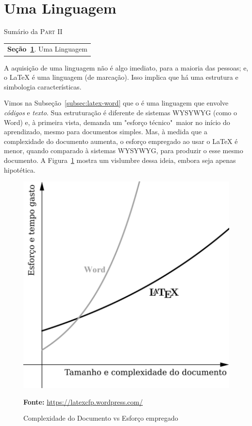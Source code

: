 \section{Uma Linguagem} %
\label{sec:aprendendo}

\begin{margintable}\vspace{.8in}\footnotesize
  \caption{Sumário da \textsc{Part II}}
  \medskip
  \begin{tabularx}{\marginparwidth}{|X}
    \textbf{\sffamily \textcolor{azulUFRB}{Seção}~\ref{sec:aprendendo}}.    {\sffamily Uma Linguagem} \\
  \end{tabularx}
\end{margintable}

A aquisição de uma linguagem não é algo imediato, para a maioria das pessoas; e,
o \LaTeX{} é uma linguagem (de marcação).
Isso implica que há uma \textsf{estrutura} e \textsf{simbologia} características.

Vimos na Subseção~\ref{subsec:latex-word} que o  é uma linguagem 
que envolve \textit{códigos} e \textit{texto}.
Sua estruturação é diferente de sistemas \textsf{WYSYWYG} (como o Word) e, à
primeira vista, demanda um "esforço técnico"\, maior no início do aprendizado, 
mesmo para documentos simples.
Mas, à medida que a complexidade do documento aumenta, o esforço empregado ao 
usar o \LaTeX{} é menor, quando comparado à sistemas \textsf{WYSYWYG}, para 
produzir o esse mesmo documento.
A Figura~\ref{fig:latex-vs-word} mostra um vislumbre dessa ideia, embora seja
apenas hipotética.

\begin{figure}[!htbp]
  \centering
  \caption{Complexidade do Documento vs Esforço empregado}
  \label{fig:latex-vs-word}
  \medskip
  \includegraphics[width = 0.6\linewidth]{figs/latex-vs-word.png}
  
  {\small \textbf{Fonte:} \url{https://latexcfp.wordpress.com/}}
\end{figure}


